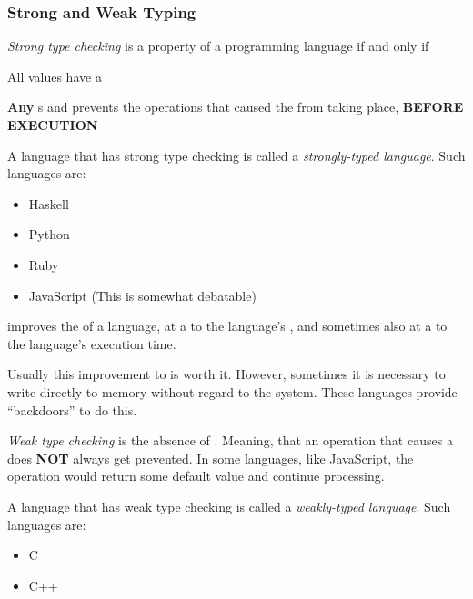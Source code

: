 \subsubsection{Strong and Weak Typing}\label{subsubsec:Strong_Weak_Typing}
\begin{definition}\label{def:Strong_Type_Checking}
  \emph{Strong type checking} is a property of a programming language if and only if
  \begin{propertylist}
  \item All values have a 
  \item \textbf{Any} s and prevents the operations that caused the  from taking place, \textbf{BEFORE EXECUTION}
  \end{propertylist}

  A language that has strong type checking is called a \emph{strongly-typed language}.
  Such languages are:
  \begin{itemize}[noitemsep]
  \item Haskell
  \item Python
  \item Ruby
  \item JavaScript (This is somewhat debatable)
  \end{itemize}

  \begin{remark}[Cost]\label{rmk:Strong_Type_Checking_Cost}
     improves the  of a language, at a  to the language's , and sometimes also at a  to the language's execution time.

    Usually this improvement to  is worth it.
    However, sometimes it is necessary to write directly to memory without regard to the  system.
    These languages provide ``backdoors'' to do this.
  \end{remark}
\end{definition}

\begin{definition}\label{def:Weak_Type_Checking}
  \emph{Weak type checking} is the absence of .
  Meaning, that an operation that causes a  does \textbf{NOT} always get prevented.
  In some languages, like JavaScript, the operation would return some default value and continue processing.

  A language that has weak type checking is called a \emph{weakly-typed language}.
  Such languages are:
  \begin{itemize}[noitemsep]
  \item C
  \item C++
  \end{itemize}
\end{definition}


